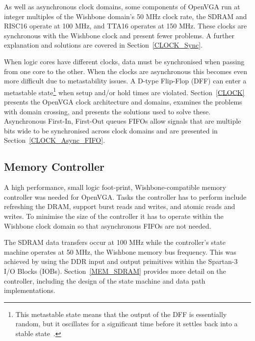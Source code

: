 As well as asynchronous clock domains, some components of OpenVGA run at integer
multiples of the Wishbone domain's 50 MHz clock rate, the SDRAM and RISC16
operate at 100 MHz, and TTA16 operates at 150 MHz. These clocks are synchronous
with the Wishbone clock and present fewer problems. A further explanation and
solutions are covered in Section~\ref{CLOCK_Sync}.

When logic cores have different clocks, data must be synchronised when passing
from one core to the other. When the clocks are asynchronous this becomes even
more difficult due to metastability issues. A D-type
Flip-Flop (DFF) can enter a
metastable state\footnote{This metastable state means that the output of the DFF
is essentially random, but it oscillates for a significant time before it settles
back into a stable state~\cite{Async_FIFO2}.} when setup and/or hold times are
violated. Section~\ref{CLOCK} presents the OpenVGA clock architecture and
domains, examines the problems with domain crossing, and presents the solutions
used to solve these. Asynchronous First-In, First-Out
queues FIFOs allow
signals that are multiple bits wide to be synchronised across clock domains and
are presented in Section~\ref{CLOCK_Async_FIFO}.


\subsection{Memory Controller}
\label{OPENVGA_Mem_Ctrl}
A high performance, small logic foot-print, Wishbone-compatible memory controller
was needed for OpenVGA. Tasks the controller has to perform include refreshing
the DRAM, support burst reads and writes, and atomic reads and writes. To
minimise the size of the controller it has to operate within the Wishbone clock
domain so that asynchronous FIFOs are not needed.

The SDRAM data transfers occur at 100 MHz while the controller's state machine
operates at 50 MHz, the Wishbone memory bus frequency. This was achieved by using
the DDR input and output primitives within the Spartan-3 I/O
Blocks (IOBs).
Section~\ref{MEM_SDRAM} provides more detail on the controller, including the
design of the state machine and data path implementations.



